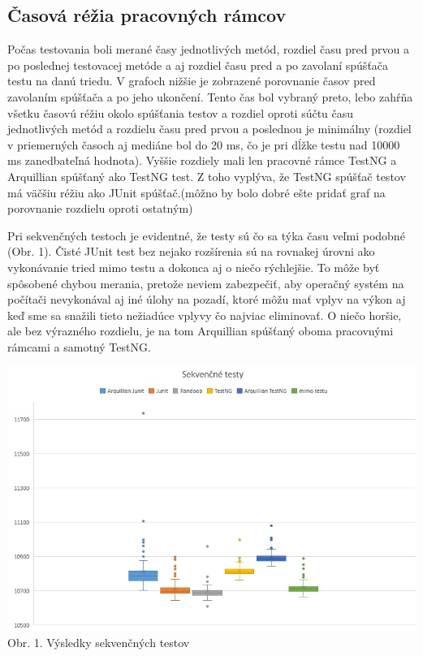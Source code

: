 \documentclass[11pt,twoside,slovak,a4paper]{article}
\begin{document}
	\subsection{Časová réžia pracovných rámcov}
	Počas testovania boli merané časy jednotlivých metód, rozdiel času pred prvou a po poslednej testovacej metóde a aj rozdiel času pred a po zavolaní spúšťača testu na danú triedu. V grafoch nižšie je zobrazené porovnanie časov pred zavolaním spúšťača a po jeho ukončení. Tento čas bol vybraný preto, lebo zahŕňa všetku časovú réžiu okolo spúšťania testov a rozdiel oproti súčtu času jednotlivých metód a rozdielu času pred prvou a poslednou je minimálny (rozdiel v priemerných časoch aj mediáne bol do 20 ms, čo je pri dĺžke testu nad 10000 ms zanedbateľná hodnota). Vyššie rozdiely mali len pracovné rámce TestNG a Arquillian spúšťaný ako TestNG test. Z toho vyplýva, že TestNG spúšťač testov má väčšiu réžiu ako JUnit spúšťač.(môžno by bolo dobré ešte pridať graf na porovnanie rozdielu oproti ostatným)
	
	Pri sekvenčných testoch je evidentné, že testy sú čo sa týka času veľmi podobné (Obr. 1). Čisté JUnit test bez nejako rozšírenia sú na rovnakej úrovni ako vykonávanie tried mimo testu a dokonca aj o niečo rýchlejšie. To môže byť spôsobené chybou merania, pretože neviem zabezpečiť, aby operačný systém na počítači nevykonával aj iné úlohy na pozadí, ktoré môžu mať vplyv na výkon aj keď sme sa snažili tieto nežiadúce vplyvy čo najviac eliminovať. O niečo horšie, ale bez výrazného rozdielu, je na tom Arquillian spúšťaný oboma pracovnými rámcami a samotný TestNG.
	
	\begin{center}
		\includegraphics[width = 400pt]{sekvencne}
		\newline
		\tiny Obr. 1. Výsledky sekvenčných testov
	\end{center}
	
\end{document}
